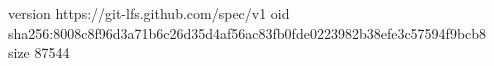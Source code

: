 version https://git-lfs.github.com/spec/v1
oid sha256:8008c8f96d3a71b6c26d35d4af56ac83fb0fde0223982b38efe3c57594f9bcb8
size 87544
